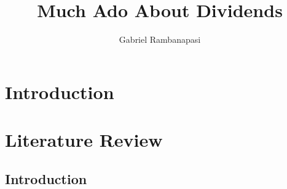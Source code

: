 \documentclass[11pt,preprint, authoryear]{elsarticle}
\numberwithin{equation}{section}
\numberwithin{figure}{section}
\numberwithin{table}{section}
\begin{document}
\begin{frontmatter}  %

\title{Much Ado About Dividends}





\author[Add1]{Gabriel Rambanapasi}





\address[Add1]{Stellenbosch University, Cape Town, South Africa}



\vspace{1cm}





\vspace{0.5cm}

\end{frontmatter}

\setcounter{footnote}{0}



\pagestyle{fancy}
\chead{}
\rhead{}
\lfoot{}
\lhead{}
\cfoot{}


\headsep 35pt %




\hypertarget{introduction}{%
\section*{Introduction}\label{introduction}}

\hypertarget{literature-review}{%
\section{Literature Review}\label{literature-review}}

\hypertarget{introduction-1}{%
\subsection{Introduction}\label{introduction-1}}
\end{document}
